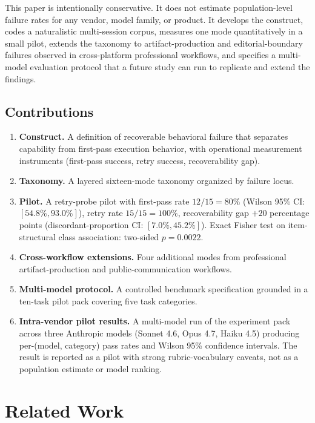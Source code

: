 \documentclass[11pt]{article}
\begin{document}
This paper is intentionally conservative. It does not estimate population-level failure rates for any vendor, model family, or product. It develops the construct, codes a naturalistic multi-session corpus, measures one mode quantitatively in a small pilot, extends the taxonomy to artifact-production and editorial-boundary failures observed in cross-platform professional workflows, and specifies a multi-model evaluation protocol that a future study can run to replicate and extend the findings.

\subsection{Contributions}
\begin{enumerate}[leftmargin=*, label=\arabic*.]
  \item \textbf{Construct.} A definition of recoverable behavioral failure that separates capability from first-pass execution behavior, with operational measurement instruments (first-pass success, retry success, recoverability gap).
  \item \textbf{Taxonomy.} A layered sixteen-mode taxonomy organized by failure locus.
  \item \textbf{Pilot.} A retry-probe pilot with first-pass rate $12/15 = 80\%$ (Wilson 95\% CI: $[54.8\%, 93.0\%]$), retry rate $15/15 = 100\%$, recoverability gap $+20$ percentage points (discordant-proportion CI: $[7.0\%, 45.2\%]$). Exact Fisher test on item-structural class association: two-sided $p = 0.0022$.
  \item \textbf{Cross-workflow extensions.} Four additional modes from professional artifact-production and public-communication workflows.
  \item \textbf{Multi-model protocol.} A controlled benchmark specification grounded in a ten-task pilot pack covering five task categories.
  \item \textbf{Intra-vendor pilot results.} A multi-model run of the experiment pack across three Anthropic models (Sonnet 4.6, Opus 4.7, Haiku 4.5) producing per-(model, category) pass rates and Wilson 95\% confidence intervals. The result is reported as a pilot with strong rubric-vocabulary caveats, not as a population estimate or model ranking.
\end{enumerate}

\section{Related Work}
\end{document}
